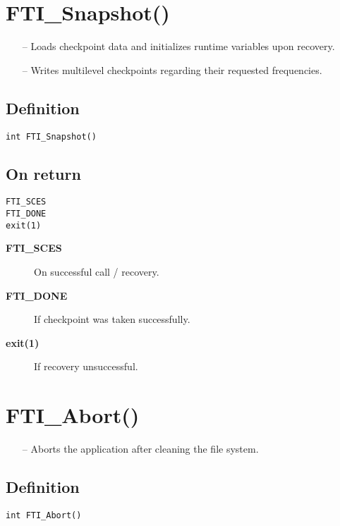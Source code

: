 \documentclass{refrep}
\begin{document}
\section{\asciifamily FTI\_Snapshot()}\label{sec:ftisnapshot}
\begin{framed}
\begin{itemize}
\item[--] Loads checkpoint data and initializes runtime variables upon recovery.
\item[--] Writes multilevel checkpoints regarding their requested frequencies.
\end{itemize}
\end{framed}
\subsection*{Definition}
\begin{lstlisting}[frame=single]
int FTI_Snapshot()
\end{lstlisting}
\subsection*{On return}
\begin{lstlisting}[frame=single]
FTI_SCES
FTI_DONE
exit(1)
\end{lstlisting}
\begin{description}
\item[\textbf{FTI\_SCES}] On successful call / recovery.
\item[\textbf{FTI\_DONE}] If checkpoint was taken successfully.
\item[\textbf{exit(1)}] If recovery unsuccessful.
\end{description}
\newpage
\section{\asciifamily FTI\_Abort()}\label{sec:ftisnapshot}
\begin{framed}
\begin{itemize}
\item[--] Aborts the application after cleaning the file system.
\end{itemize}
\end{framed}
\subsection*{Definition}
\begin{lstlisting}[frame=single]
int FTI_Abort()
\end{lstlisting}
\end{document}
